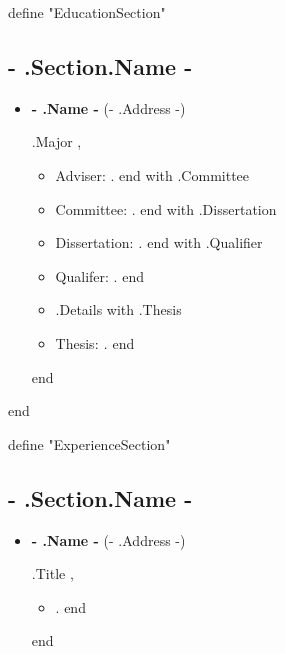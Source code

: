 {{define "EducationSection"}}

\hypertarget{ {{- .Section.Label -}} }{%
\subsection{ {{- .Section.Name -}} }\label{ {{- .Section.Label -}} } }

\begin{itemize}
\tightlist
{{ range .Schools  }}
\item \textbf{ {{- .Name -}} } ({{- .Address -}})

{{ .Major }}, { }

  \begin{itemize}[align=right]
  \tightlist
      {{with .Advisor }}  \item Adviser: {{ . }} {{end}}
      {{with .Committee }}\item Committee: {{ . }} {{end}}
      {{with .Dissertation }}   \item Dissertation: \emph{ {{ . }} }{{end}}
      {{with .Qualifier }}\item Qualifer: {{ . }} {{end}}
      \item {{.Details}}
      {{with .Thesis }}   \item Thesis: \emph{ {{ . }} }{{end}}
   \end{itemize}
{{end}}
\end{itemize}

{{end}}

{{define "ExperienceSection"}}

\hypertarget{ {{- .Section.Label -}} }{%
\subsection{ {{- .Section.Name -}} }\label{ {{- .Section.Label -}} } }

\begin{itemize}
\tightlist
{{ range .Items  }}
\item \textbf{ {{- .Name -}} } ({{- .Address -}})

{{ .Title }}, { }

  \begin{itemize}[align=right]
  \tightlist
      {{range .Details }}
      \item {{ . }}
      {{end}}
   \end{itemize}
{{end}}
\end{itemize}

